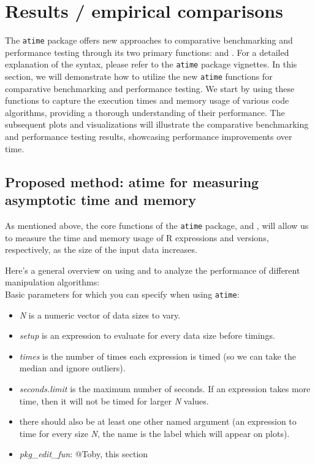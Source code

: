 \vspace{0.1in}

\section{Results / empirical comparisons}

\noindent The \texttt{atime} package offers new approaches to comparative benchmarking and performance testing through its two primary functions:  and . For a detailed explanation of the syntax, please refer to the \texttt{atime} package vignettes. In this section, we will demonstrate how to utilize the new \texttt{atime} functions for comparative benchmarking and performance testing. We start by using these functions to capture the execution times and memory usage of various code algorithms, providing a thorough understanding of their performance. The subsequent plots and visualizations will illustrate the comparative benchmarking and performance testing results, showcasing performance improvements over time.\\

\subsection{Proposed method: atime for measuring asymptotic time and memory}

\noindent As mentioned above, the core functions of the \texttt{atime} package,  and , will allow us to measure the time and memory usage of R expressions and versions, respectively, as the size of the input data increases.

\noindent Here's a general overview on using  and  to analyze the performance of different manipulation algorithms:\\

\noindent Basic parameters for which you can specify when using \texttt{atime}:

\begin{itemize}
 \item \textit{N} is a numeric vector of data sizes to vary.
  \item \textit{setup} is an expression to evaluate for every data size before timings.
  \item \textit{times} is the number of times each expression is timed (so we can take the median and ignore outliers).
  \item \textit{seconds.limit} is the maximum number of seconds. If an expression takes more time, then it will not be timed for larger \textit{N} values.
  \item there should also be at least one other named argument (an expression to time for every size \textit{N}, the name is the label which will appear on plots).
  \item \textit{pkg\_edit\_fun}: @Toby, this section

\end{itemize}

